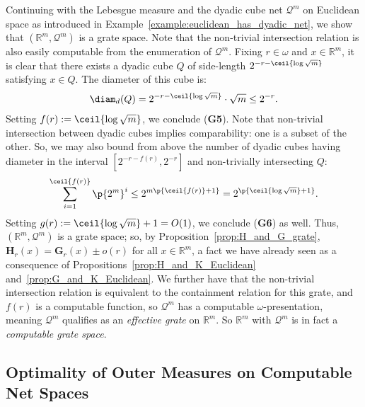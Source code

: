 \begin{example}
    \label{example:euclidean_has_grate}
    Continuing with the Lebesgue measure and the dyadic cube net $\mathcal{Q}^m$ on Euclidean space as introduced in Example~\ref{example:euclidean_has_dyadic_net}, we show that $(\mathbb{R}^m, \mathcal{Q}^m)$ is a grate space. Note that the non-trivial intersection relation is also easily computable from the enumeration of $\mathcal{Q}^m$. Fixing $r \in \omega$ and $x \in \mathbb{R}^m$, it is clear that there exists a dyadic cube $Q$ of side-length $2^{- r - \ceil{ \log \sqrt{m}}}$ satisfying $x \in Q$. The diameter of this cube is:
    \begin{align*}
        \diam_d (Q) = 2^{- r - \ceil{ \log \sqrt{m}}} \cdot \sqrt{m} \leq 2^{- r}.
    \end{align*}
    Setting $f(r) := \ceil{\log \sqrt{m}}$, we conclude (\textbf{G5}). Note that non-trivial intersection between dyadic cubes implies comparability: one is a subset of the other. So, we may also bound from above the number of dyadic cubes having diameter in the interval $[2^{-r - f(r)}, 2^{-r}]$ and non-trivially intersecting $Q$: 
    \begin{align*}
        \sum_{i = 1}^{\ceil{f(r)}} \p{2^{m}}^i \leq 2^{m\p{\ceil{f(r)} + 1}} = 2^{\p{\ceil{\log \sqrt{m}} + 1}}.
    \end{align*}
    Setting $g(r) := \ceil{\log \sqrt{m}} + 1 = O(1)$, we conclude (\textbf{G6}) as well. Thus, $(\mathbb{R}^m, \mathcal{Q}^m)$ is a grate space; so, by Proposition~\ref{prop:H_and_G_grate}, $\mathbf{H}_r(x) = \mathbf{G}_r(x) \pm o(r)$ for all $x \in \mathbb{R}^m$, a fact we have already seen as a consequence of Propositions~\ref{prop:H_and_K_Euclidean} and~\ref{prop:G_and_K_Euclidean}. We further have that the non-trivial intersection relation is equivalent to the containment relation for this grate, and $f(r)$ is a computable function, so $\mathcal{Q}^m$ has a computable $\omega$-presentation, meaning $\mathcal{Q}^m$ qualifies as an \textit{effective grate} on $\mathbb{R}^m$. So $\mathbb{R}^m$ with $\mathcal{Q}^m$ is in fact a \textit{computable grate space}. 
\end{example}

\subsection{Optimality of Outer Measures on Computable Net Spaces}

